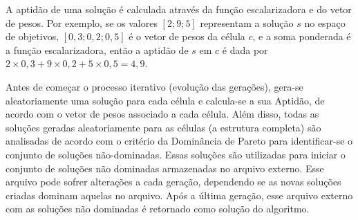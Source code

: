 A aptidão de uma solução é calculada através da função escalarizadora e do vetor de pesos. Por exemplo, se os valores $[2; 9; 5]$ representam a solução $s$ no espaço de objetivos, $[0,3; 0,2; 0,5]$ é o vetor de pesos da célula $c$, e a soma ponderada é a função escalarizadora, então a aptidão de $s$ em $c$ é dada por $2 \times 0,3 + 9 \times 0,2 + 5 \times 0,5 = 4,9$.

Antes de começar o processo iterativo (evolução das gerações), gera-se aleatoriamente uma solução para cada célula e calcula-se a sua
Aptidão, de acordo com o vetor de pesos associado a cada célula. Além disso, todas as soluções geradas aleatoriamente para as células (a estrutura completa) são analisadas de acordo com o critério da Dominância de Pareto para identificar-se o conjunto de soluções não-dominadas. Essas soluções são utilizadas para iniciar o conjunto de soluções não dominadas armazenadas no arquivo externo. Esse arquivo pode sofrer alterações a cada geração, dependendo se as novas soluções criadas dominam aquelas no arquivo. Após a última geração, esse arquivo externo com as soluções não dominadas é retornado como solução do algoritmo.

